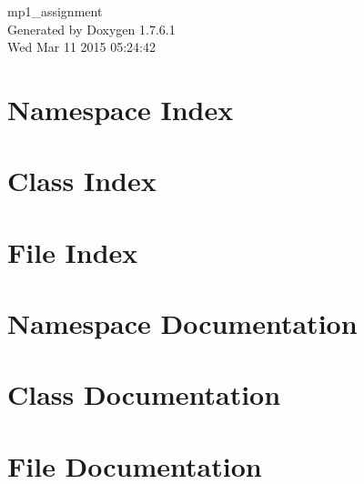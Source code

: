\documentclass[a4paper]{book}
\begin{document}
\hypersetup{pageanchor=false,citecolor=blue}
\begin{titlepage}
\vspace*{7cm}
\begin{center}
{\Large mp1\-\_\-assignment }\\
\vspace*{1cm}
{\large \-Generated by Doxygen 1.7.6.1}\\
\vspace*{0.5cm}
{\small Wed Mar 11 2015 05:24:42}\\
\end{center}
\end{titlepage}
\clearemptydoublepage
{}
\tableofcontents
\clearemptydoublepage
{}
\hypersetup{pageanchor=true,citecolor=blue}
\chapter{\-Namespace \-Index}

\chapter{\-Class \-Index}

\chapter{\-File \-Index}

\chapter{\-Namespace \-Documentation}

\chapter{\-Class \-Documentation}














\chapter{\-File \-Documentation}















\printindex
\end{document}
